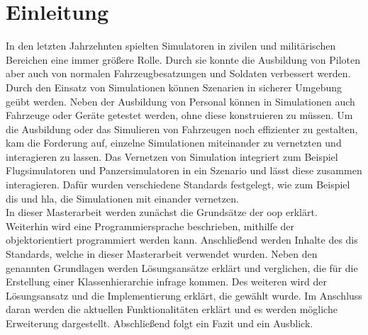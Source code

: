 \chapter{Einleitung}\label{Einleitung}
\onehalfspacing
In den letzten Jahrzehnten spielten Simulatoren in zivilen und militärischen Bereichen eine immer größere Rolle. Durch sie konnte die Ausbildung von Piloten aber auch von normalen Fahrzeugbesatzungen und Soldaten verbessert werden. Durch den Einsatz von Simulationen können Szenarien in sicherer Umgebung geübt werden. Neben der Ausbildung von Personal können in Simulationen auch Fahrzeuge oder Geräte getestet werden, ohne diese konstruieren zu müssen. 
Um die Ausbildung oder das Simulieren von Fahrzeugen noch effizienter zu gestalten, kam die Forderung auf, einzelne Simulationen miteinander zu vernetzten und interagieren zu lassen. Das Vernetzen von Simulation integriert zum Beispiel Flugsimulatoren und Panzersimulatoren in ein Szenario und lässt diese zusammen interagieren. 
Dafür wurden verschiedene Standards festgelegt, wie zum Beispiel \ac{dis} und \ac{hla}, die Simulationen mit einander vernetzen.  \\
In dieser Masterarbeit werden zunächst die Grundsätze der \ac{oop} erklärt. Weiterhin wird eine Programmiersprache beschrieben, mithilfe der objektorientiert programmiert werden kann. Anschließend werden  Inhalte des \ac{dis} Standards, welche in dieser Masterarbeit verwendet wurden. Neben den genannten Grundlagen werden Lösungsansätze erklärt und verglichen, die für die Erstellung einer Klassenhierarchie infrage kommen. Des weiteren wird der Lösungsansatz und die Implementierung  erklärt, die gewählt wurde. Im Anschluss daran werden die aktuellen Funktionalitäten erklärt und es werden mögliche Erweiterung dargestellt. Abschließend folgt ein Fazit und ein Ausblick.  
       
